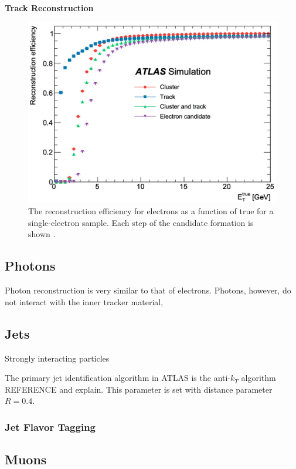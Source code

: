 \noindent\textbf{Track Reconstruction}\\
\indent

\begin{figure}[!thp]
    \centering
    \includegraphics[width=.65\textwidth]{chapters/chapter3_eventreco/images/electron-efficiency.png}

    \caption[The reconstruction efficiency for electrons as a function of true \et.]{The reconstruction efficiency for electrons as a function of true \et for a single-electron sample. Each step of the candidate formation is shown \cite{electron-efficiency}.}
    \label{fig:electron-eff}
\end{figure}


\subsection{Photons} 

Photon reconstruction is very similar to that of electrons. Photons, however, do not interact with the inner tracker material, 

\subsection{Jets}
Strongly interacting particles 

The primary jet identification algorithm in ATLAS is the anti-$k_T$ algorithm REFERENCE and explain. This parameter is set with distance parameter $R=0.4$.

\subsubsection{Jet Flavor Tagging}
\subsection{Muons}
